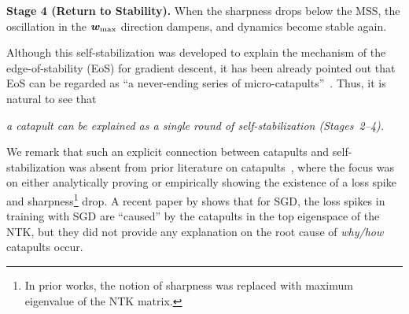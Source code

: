 
\textbf{Stage 4 (Return to Stability).} When the sharpness drops below the MSS, the oscillation in the ${\bm{w}}_{\max}$ direction dampens, and dynamics become stable again.


Although this self-stabilization was developed to explain the mechanism of the edge-of-stability (EoS) for gradient descent, it has been already pointed out that EoS can be regarded as ``a never-ending series of micro-catapults''~\citep[Section 3.2]{cohen2021stability}.
Thus, it is natural to see that 
\begin{center}
    {\it a catapult can be explained as a single round of self-stabilization (Stages~2--4).}
\end{center}

We remark that such an explicit connection between catapults and self-stabilization was absent from prior literature on catapults~\citep{zhu2023catapult,zhu2023catapultquadratic,lewkowycz2020catapult}, where the focus was on either analytically proving or empirically showing the existence of a loss spike and sharpness\footnote{In prior works, the notion of sharpness was replaced with maximum eigenvalue of the NTK matrix.} drop.
A recent paper by \cite{zhu2023catapult} shows that for SGD, the loss spikes in training with SGD are ``caused'' by the catapults in the top eigenspace of the NTK, but they did not provide any explanation on the root cause of {\it why/how} catapults occur.








